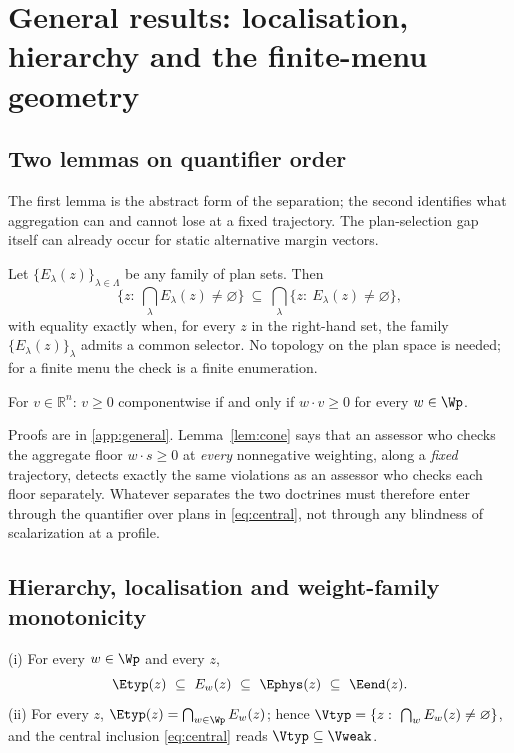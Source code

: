 \section{General results: localisation, hierarchy and the finite-menu geometry}\label{sec:general}

\subsection{Two lemmas on quantifier order}

The first lemma is the abstract form of the separation; the second identifies what aggregation can and cannot lose at a fixed trajectory. The plan-selection gap itself can already occur for static alternative margin vectors.

\begin{lemma}\label{lem:quant}
Let $\{E_\lambda(z)\}_{\lambda\in\Lambda}$ be any family of plan sets. Then
\[
\Big\{z:\ \textstyle\bigcap_\lambda E_\lambda(z)\neq\varnothing\Big\}\ \subseteq\ \bigcap_\lambda\big\{z:\ E_\lambda(z)\neq\varnothing\big\},
\]
with equality exactly when, for every $z$ in the right-hand set, the family $\{E_\lambda(z)\}_\lambda$ admits a common selector. No topology on the plan space is needed; for a finite menu the check is a finite enumeration.
\end{lemma}

\begin{lemma}\label{lem:cone}
For $v\in\mathbb R^n$: $v\ge0$ componentwise if and only if $w\cdot v\ge0$ for every $w\in\Wp$.
\end{lemma}

Proofs are in \ref{app:general}. Lemma~\ref{lem:cone} says that an assessor who checks the aggregate floor $w\cdot s\ge0$ at \emph{every} nonnegative weighting, along a \emph{fixed} trajectory, detects exactly the same violations as an assessor who checks each floor separately. Whatever separates the two doctrines must therefore enter through the quantifier over plans in \eqref{eq:central}, not through any blindness of scalarization at a profile.

\subsection{Hierarchy, localisation and weight-family monotonicity}

\begin{proposition}\label{prop:hierarchy}
\textup{(i)} For every $w\in\Wp$ and every $z$,
\[
\Etyp(z)\ \subseteq\ E_w(z)\ \subseteq\ \Ephys(z)\ \subseteq\ \Eend(z).
\]
\textup{(ii)} For every $z$, $\Etyp(z)=\bigcap_{w\in\Wp}E_w(z)$; hence $\Vtyp=\{z:\ \bigcap_wE_w(z)\neq\varnothing\}$, and the central inclusion \eqref{eq:central} reads $\Vtyp\subseteq\Vweak$.
\end{proposition}

